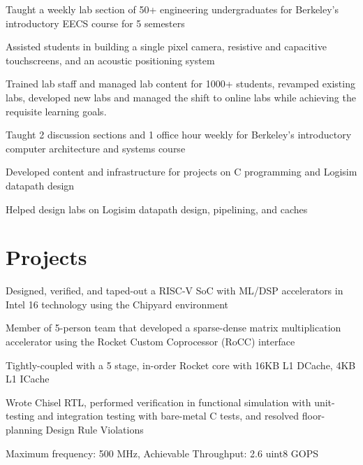 \documentclass[]{deedy-resume-openfont}
\begin{document}
\vspace{\topsep} %
\begin{tightemize}
\item Taught a weekly lab section of 50+ engineering undergraduates for Berkeley's introductory EECS course for 5 semesters
\item Assisted students in building a single pixel camera, resistive and capacitive touchscreens, and an acoustic positioning system
\item Trained lab staff and managed lab content for 1000+ students, revamped existing labs, developed new labs and managed the shift to online labs while achieving the requisite learning goals. 
\end{tightemize}
\sectionsep

\vspace{\topsep} %
\begin{tightemize}
\item Taught 2 discussion sections and 1 office hour weekly for Berkeley's introductory computer architecture and systems course
\item Developed content and infrastructure for projects on C programming and Logisim datapath design
\item Helped design labs on Logisim datapath design, pipelining, and caches
\end{tightemize}
\sectionsep

\section{Projects}

\begin{tightemize}
\item Designed, verified, and taped-out a RISC-V SoC with ML/DSP accelerators in Intel 16 technology using the Chipyard environment 
\item Member of 5-person team that developed a sparse-dense matrix multiplication accelerator using the Rocket Custom Coprocessor (RoCC) interface
\item Tightly-coupled with a 5 stage, in-order Rocket core with 16KB L1 DCache, 4KB L1 ICache
\item Wrote Chisel RTL, performed verification in functional simulation with unit-testing and integration testing with bare-metal C tests, and resolved floor-planning Design Rule Violations
\item Maximum frequency: 500 MHz, Achievable Throughput: 2.6 uint8 GOPS
\end{tightemize}
\sectionsep
\end{document}
